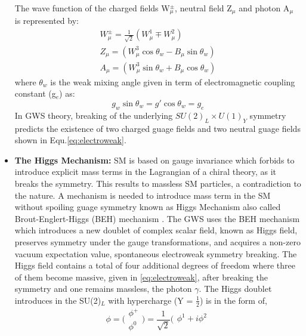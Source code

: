 \begin{itemize}
The wave function of the charged fields W$^{\pm}_{\mu}$, neutral field Z$_{\mu}$ and photon A$_{\mu}$ is represented by:
\begin{equation}\label{eq:electroweak}
\begin{split}
W^{\pm}_{\mu} = \frac{1}{\sqrt{2}}\left( W_{\mu}^{1} \mp W_{\mu}^{2}\right)\\
Z_{\mu} = \left( W_{\mu}^{3}\cos\theta_{w} - B_{\mu}\sin\theta_{w}\right)\\
A_{\mu} = \left( W_{\mu}^{3}\sin\theta_{w} + B_{\mu}\cos\theta_{w}\right)
\end{split}
\end{equation}   
where $\theta_{w}$ is the weak mixing angle given in term of electromagnetic coupling constant (g$_{e}$) as:
\begin{equation}
g_{w}\sin\theta_{w} = g'\cos\theta_{w} = g_{e} 
\end{equation} 
In GWS theory, breaking of the underlying $SU(2)_{L}\times U(1)_{Y}$ symmetry predicts the existence of two charged guage fields and two neutral guage fields shown in Equ.\ref{eq:electroweak}.  
\item{\label{item:higgs_mechanism}\textbf{The Higgs Mechanism:}} SM is based on gauge invariance which forbids to introduce explicit mass terms in the Lagrangian of a chiral theory, as it breaks the symmetry. This results to massless SM particles, a contradiction to the nature. A mechanism is needed to introduce mass term in the SM without spoiling guage symmetry known as Higgs Mechanism also called Brout-Englert-Higgs (BEH) mechanism \cite{eng_brout,p_w_higgs}. The GWS uses the BEH mechanism which introduces a new doublet of complex scalar field, known as Higgs field, preserves symmetry under the gauge transformations, and acquires a non-zero vacuum expectation value, spontaneous electroweak symmetry breaking. The Higgs field contains a total of four additional degrees of freedom where three of them become massive, given in \ref{eq:electroweak}, after breaking the symmetry and one remains massless, the photon $\gamma$. The Higgs doublet introduces in the SU(2)$_{L}$ with hypercharge (Y = $\frac{1}{2}$) is in the form of,
\begin{equation}
\phi = \Big(\begin{array}{c}
\phi^{+}\\
\phi^{0} \end{array}\Big)
= \frac{1}{\sqrt{2}}
\Big(\begin{array}{c}
\phi^{1} + i\phi^{2}\\

\end{array}
\end{equation}
\end{itemize}
